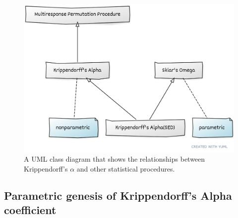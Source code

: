 \begin{figure}[ht]
   \centering
   \includegraphics[scale=.35]{kripp.png}
   \caption{A UML class diagram that shows the relationships between Krippendorff's $\alpha$ and other statistical procedures.}
   \label{fig:kripp}
\end{figure}

\subsection{Parametric genesis of Krippendorff's Alpha coefficient}
\label{genesis}

